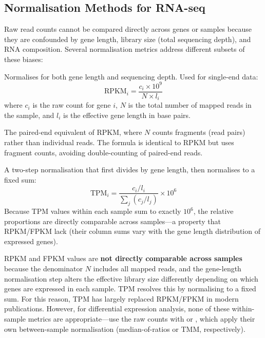 \subsection{Normalisation Methods for RNA-seq}
\label{subsec:rnaseq:normalisation}

Raw read counts cannot be compared directly across genes or samples because they
are confounded by gene length, library size (total sequencing depth), and RNA
composition. Several normalisation metrics address different subsets of these
biases:

\begin{description}[style=nextline]
  \item[RPKM (Reads Per Kilobase per Million mapped reads)]
    Normalises for both gene length and sequencing depth. Used for single-end
    data:
    \begin{equation}
      \label{eq:rnaseq:rpkm}
      \text{RPKM}_i = \frac{c_i \times 10^9}{N \times l_i}
    \end{equation}
    where $c_i$ is the raw count for gene $i$, $N$ is the total number of mapped
    reads in the sample, and $l_i$ is the effective gene length in base pairs.
  \item[FPKM (Fragments Per Kilobase per Million mapped fragments)]
    The paired-end equivalent of RPKM, where $N$ counts fragments (read pairs)
    rather than individual reads. The formula is identical to RPKM but uses
    fragment counts, avoiding double-counting of paired-end reads.
  \item[TPM (Transcripts Per Million)]
    A two-step normalisation that first divides by gene length, then normalises
    to a fixed sum:
    \begin{equation}
      \label{eq:rnaseq:tpm}
      \text{TPM}_i = \frac{c_i / l_i}{\sum_{j} (c_j / l_j)} \times 10^6
    \end{equation}
    Because TPM values within each sample sum to exactly $10^6$, the relative
    proportions are directly comparable across samples---a property that RPKM/FPKM
    lack (their column sums vary with the gene length distribution of expressed
    genes).
\end{description}

\begin{warningbox}
RPKM and FPKM values are \textbf{not directly comparable across samples}
because the denominator $N$ includes all mapped reads, and the gene-length
normalisation step alters the effective library size differently depending on
which genes are expressed in each sample. TPM resolves this by normalising to a
fixed sum. For this reason, TPM has largely replaced RPKM/FPKM in modern
publications. However, for differential expression analysis, none of these
within-sample metrics are appropriate---use the raw counts with 
or , which apply their own between-sample normalisation
(median-of-ratios or TMM, respectively).
\end{warningbox}

